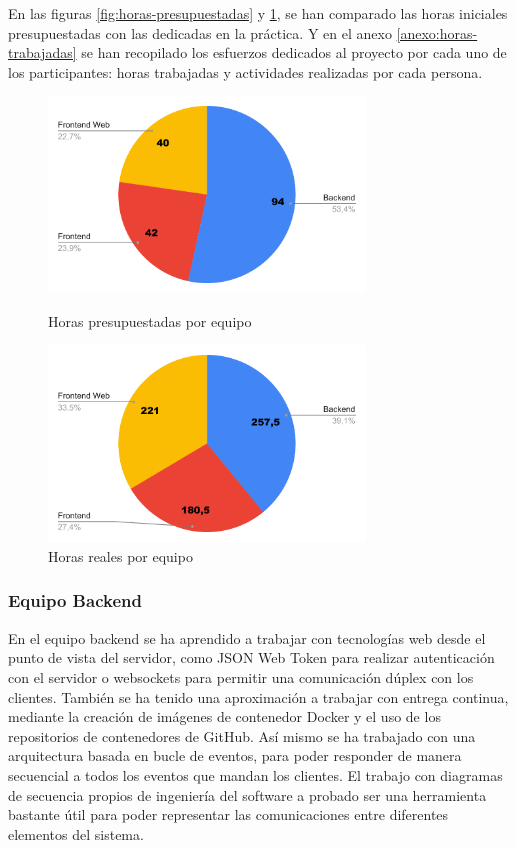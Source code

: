 \documentclass{article}
\begin{document}
En las figuras \ref{fig:horas-presupuestadas} y \ref{fig:horas-reales}, se han
comparado las horas iniciales presupuestadas con las dedicadas en la práctica.
Y en el anexo \ref{anexo:horas-trabajadas} se han recopilado los esfuerzos dedicados
al proyecto por cada uno de los participantes: horas trabajadas y actividades
realizadas por cada persona.

\begin{figure}[h]
    \centering
    \includegraphics[width=0.75\textwidth]{../images/horasEquipos/horasPresupuestadas.pdf}
    \caption{Horas presupuestadas por equipo}
    \label{fig:horas-presupuestadas}


    \includegraphics[width=0.75\textwidth]{../images/horasEquipos/horasReales.pdf}
    \caption{Horas reales por equipo}
    \label{fig:horas-reales}
\end{figure}

\subsubsection*{Equipo Backend}
En el equipo backend se ha aprendido a trabajar con tecnologías web desde el punto de vista del servidor, como JSON Web Token para realizar autenticación con el servidor o websockets para permitir una comunicación dúplex con los clientes.
También se ha tenido una aproximación a trabajar con entrega continua, mediante la creación de imágenes de contenedor Docker y el uso de los repositorios de contenedores de GitHub.
Así mismo se ha trabajado con una arquitectura basada en bucle de eventos, para poder responder de manera secuencial a todos los eventos que mandan los clientes.
El trabajo con diagramas de secuencia propios de ingeniería del software a probado ser una herramienta bastante útil para poder representar las comunicaciones entre diferentes elementos del sistema.
\end{document}

